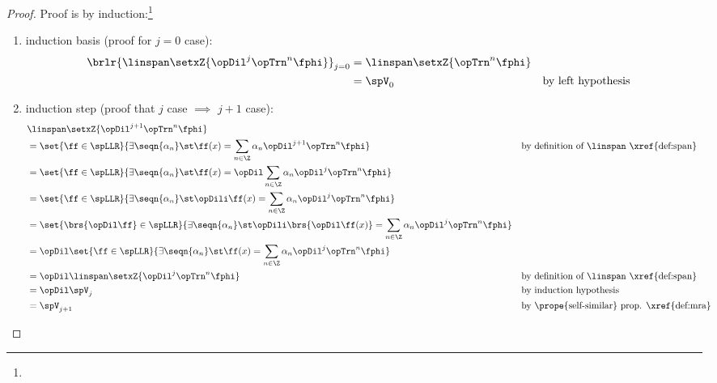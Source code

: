 \begin{proof} Proof is by induction:\footnote{}
\begin{enumerate}
\item induction basis (proof for $j=0$ case):
  \begin{align*}
    \brlr{\linspan\setxZ{\opDil^j\opTrn^n\fphi}}_{j=0}
      &= \linspan\setxZ{\opTrn^n\fphi}
    \\&= \spV_0
      && \text{by left hypothesis}
  \end{align*}

\item induction step (proof that $j$ case $\implies$ $j+1$ case):
  \begin{align*}
    &\linspan\setxZ{\opDil^{j+1}\opTrn^n\fphi}
    \\&= \set{\ff\in\spLLR}{\exists \seqn{\alpha_n} \st \ff(x)=\sum_{n\in\Z}\alpha_n \opDil^{j+1}\opTrn^n\fphi}
      && \text{by definition of $\linspan$ \xref{def:span}}
    \\&= \set{\ff\in\spLLR}{\exists \seqn{\alpha_n} \st \ff(x)=\opDil\sum_{n\in\Z}\alpha_n \opDil^{j}\opTrn^n\fphi}
    \\&= \set{\ff\in\spLLR}{\exists \seqn{\alpha_n} \st \opDili\ff(x)=\sum_{n\in\Z}\alpha_n \opDil^{j}\opTrn^n\fphi}
    \\&= \set{\brs{\opDil\ff}\in\spLLR}{\exists \seqn{\alpha_n} \st \opDili\brs{\opDil\ff(x)}=\sum_{n\in\Z}\alpha_n \opDil^{j}\opTrn^n\fphi}
    \\&= \opDil\set{\ff\in\spLLR}{\exists \seqn{\alpha_n} \st \ff(x)=\sum_{n\in\Z}\alpha_n \opDil^{j}\opTrn^n\fphi}
    \\&= \opDil\linspan\setxZ{\opDil^j\opTrn^n\fphi}
      && \text{by definition of $\linspan$ \xref{def:span}}
    \\&= \opDil\spV_j
      && \text{by induction hypothesis}
    \\&= \spV_{j+1}
      && \text{by \prope{self-similar} prop. \xref{def:mra}}
  \end{align*}
\end{enumerate}
\end{proof}

